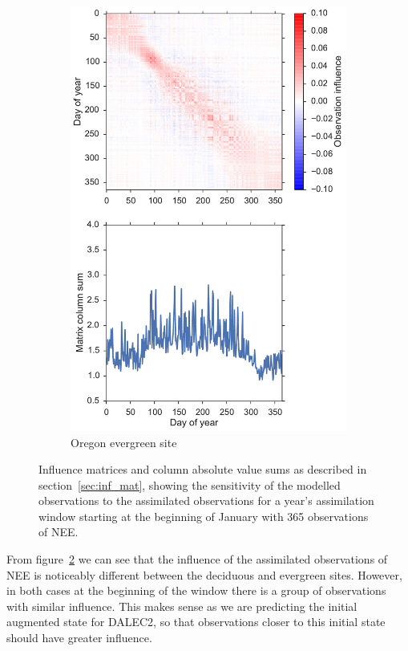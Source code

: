 \documentclass[11pt]{article}
\begin{document}
\begin{figure}[ht]
\begin{subfigure}[b]{0.46\textwidth}
        \includegraphics[width=\textwidth]{inf_mat_so.pdf}
        \caption{Oregon evergreen site}
        \label{fig:oregon_inf_mat}
    \end{subfigure}
    \caption{Influence matrices and column absolute value sums as described in section~\ref{sec:inf_mat}, showing the sensitivity of the modelled observations to the assimilated observations for a year's assimilation window starting at the beginning of January with 365 observations of NEE.}
    \label{fig:inf_mats}
\end{figure}

From figure~\ref{fig:inf_mats} we can see that the influence of the assimilated observations of NEE is noticeably different between the deciduous and evergreen sites. However, in both cases at the beginning of the window there is a group of observations with similar influence. This makes sense as we are predicting the initial augmented state for DALEC2, so that observations closer to this initial state should have greater influence. 
\end{document}
